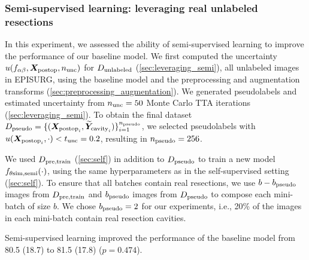 \subsubsection{Semi-supervised learning: leveraging real unlabeled resections}
\label{sec:results_semi}

\newcommand{\pseudo}{\st{pseudo}}

In this experiment, we assessed the ability of semi-supervised learning to improve the performance of our baseline model.
We first computed the uncertainty $u(f_{\alpha\beta}, \bm{X}_{\textnormal{postop}}, n_{\textnormal{unc}})$ for $D_{\textnormal{unlabeled}}$ (\cref{sec:leveraging_semi}), all unlabeled images in EPISURG, using the baseline model and the preprocessing and augmentation transforms (\cref{sec:preprocessing_augmentation}).
We generated pseudolabels and estimated uncertainty from $n_{\textnormal{unc}} = 50$ Monte Carlo \ac{TTA} iterations (\cref{sec:leveraging_semi}).
To obtain the final dataset $D\pseudo = \{ (\X_{\text{postop}_i}, \wt{\Y}_{\text{cavity}_i}) \}_{i = 1}^{n\pseudo}$, we selected pseudolabels with $u(\bm{X}_{\text{postop}_i}, \cdot) < t_{\textnormal{unc}} = 0.2$, resulting in $n\pseudo = 256$.

We used $D_{\textnormal{pre,train}}$ (\cref{sec:self}) in addition to $D\pseudo$ to train a new model $f_{\theta \text{sim,semi}}(\cdot)$, using the same hyperparameters as in the self-supervised setting (\cref{sec:self}).
To ensure that all batches contain real resections, we use $b - b\pseudo$ images from $D_{\textnormal{pre,train}}$ and $b\pseudo$ images from $D\pseudo$ to compose each mini-batch of size $b$.
We chose $b\pseudo = 2$ for our experiments, i.e., 20\% of the images in each mini-batch contain real resection cavities.

Semi-supervised learning improved the performance of the baseline model from 80.5 (18.7) to 81.5 (17.8) ($p = 0.474$).


